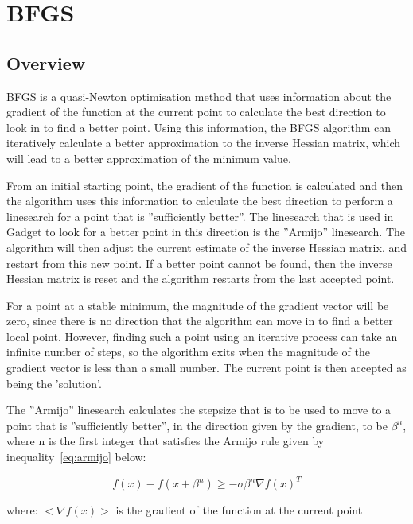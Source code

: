 \documentclass[10pt,twoside]{book}
\begin{document}
\section{BFGS}\label{sec:bfgs}
\subsection{Overview}\label{subsec:bfgsover}
BFGS is a quasi-Newton optimisation method that uses information about the gradient of the function at the current point to calculate the best direction to look in to find a better point.  Using this information, the BFGS algorithm can iteratively calculate a better approximation to the inverse Hessian matrix, which will lead to a better approximation of the minimum value.

\bigskip
From an initial starting point, the gradient of the function is calculated and then the algorithm uses this information to calculate the best direction to perform a linesearch for a point that is ''sufficiently better''.  The linesearch that is used in Gadget to look for a better point in this direction is the ''Armijo'' linesearch.  The algorithm will then adjust the current estimate of the inverse Hessian matrix, and restart from this new point.  If a better point cannot be found, then the inverse Hessian matrix is reset and the algorithm restarts from the last accepted point.

\bigskip
For a point at a stable minimum, the magnitude of the gradient vector will be zero, since there is no direction that the algorithm can move in to find a better local point.  However, finding such a point using an iterative process can take an infinite number of steps, so the algorithm exits when the magnitude of the gradient vector is less than a small number.  The current point is then accepted as being the 'solution'.

\bigskip
The ''Armijo'' linesearch calculates the stepsize that is to be used to move to a point that is ''sufficiently better'', in the direction given by the gradient, to be $\beta^n$, where n is the first integer that satisfies the Armijo rule given by inequality~\ref{eq:armijo} below:

\begin{equation}\label{eq:armijo}
f(x) - f(x + \beta^{n}) \geq - \sigma \beta^{n} \nabla f(x) ^{T}
\end{equation}

where:\newline
$<\nabla f(x)>$ is the gradient of the function at the current point
\end{document}
